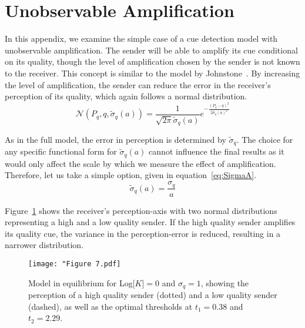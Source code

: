 \documentclass[a4paper,12pt]{article}
\numberwithin{equation}{section}
\numberwithin{figure}{section}
\begin{document}
\newpage


\section{Unobservable Amplification}
\label{sec:Unobservable Amplification}

In this appendix, we examine the simple case of a cue detection model with unobservable amplification. The sender will be able to amplify its cue conditional on its quality, though the level of amplification chosen by the sender is not known to the receiver. This concept is similar to the model by Johnstone~\cite{Johnstone1997}. By increasing the level of amplification, the sender can reduce the error in the receiver's perception of its quality, which again follows a normal distribution.
\begin{equation}
\label{eq:CueDetectionModelwithAmplification/Normal}
\mathcal{N}(P_{q}, q, \tilde{\sigma}_{q}(a)) = \frac{1}{\sqrt{2 \pi} \tilde{\sigma}_{q}(a)} e^{-\frac{(P_{q}-q)^2}{2 \tilde{\sigma}_{q}(a)^2}}
\end{equation}

As in the full model, the error in perception is determined by $\tilde{\sigma}_{q}$. The choice for any specific functional form for $\tilde{\sigma}_{q}(a)$ cannot influence the final results as it would only affect the scale by which we measure the effect of amplification. Therefore, let us take a simple option, given in equation~\ref{eq:SigmaA}.
\begin{equation}
\label{eq:SigmaA}
\tilde{\sigma}_{q}(a)=\frac{\sigma_{q}}{a}
\end{equation}

Figure~\ref{fig:Figure 7.pdf} shows the receiver's perception-axis with two normal distributions representing a high and a low quality sender. If the high quality sender amplifies its quality cue, the variance in the perception-error is reduced, resulting in a narrower distribution.

\begin{figure}[h]
\captionsetup{width=360pt}
\begin{center}
\leavevmode
\texttt{[image: "Figure 7.pdf]}
\caption[]{Model in equilibrium for Log[$K$]$=0$ and $\sigma_{q}=1$, showing the perception of a high quality sender (dotted) and a low quality sender (dashed), as well as the optimal thresholds at $t_{1}=0.38$ and $t_{2}=2.29$.}
\label{fig:Figure 7.pdf}
\end{center}
\end{figure}
\end{document}
